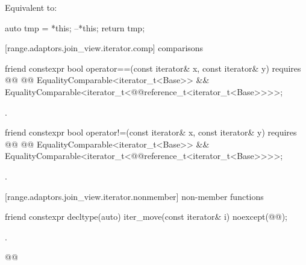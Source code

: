 \begin{itemdescr}
\pnum
\effects Equivalent to:
\begin{codeblock}
auto tmp = *this;
--*this;
return tmp;
\end{codeblock}
\end{itemdescr}

[range.adaptors.join_view.iterator.comp]{ comparisons}

\begin{itemdecl}
friend constexpr bool operator==(const iterator& x, const iterator& y)
  requires @@
    @@ EqualityComparable<iterator_t<Base>> &&
    EqualityComparable<iterator_t<@@reference_t<iterator_t<Base>>>>;
\end{itemdecl}

\begin{itemdescr}
\pnum
\returns {}.
\end{itemdescr}

\begin{itemdecl}
friend constexpr bool operator!=(const iterator& x, const iterator& y)
  requires @@
    @@ EqualityComparable<iterator_t<Base>> &&
    EqualityComparable<iterator_t<@@reference_t<iterator_t<Base>>>>;
\end{itemdecl}

\begin{itemdescr}
\pnum
\returns {}.
\end{itemdescr}

[range.adaptors.join_view.iterator.nonmember]{ non-member functions}

\begin{itemdecl}
friend constexpr decltype(auto) iter_move(const iterator& i)
  noexcept(@\oldtxt{\seebelow}@);
\end{itemdecl}

\begin{itemdescr}
\pnum
\returns {}.

\pnum
{}
\begin{codeblock}
@@
\end{codeblock}
\end{itemdescr}

